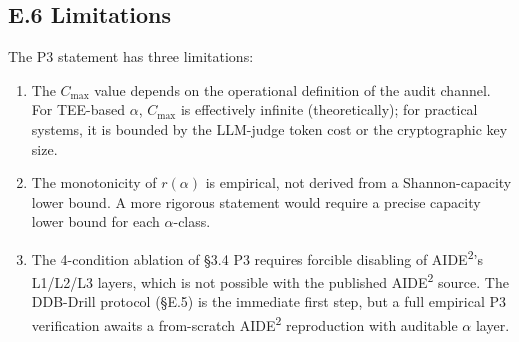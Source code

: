 \subsection*{E.6 Limitations}

The P3 statement has three limitations:
\begin{enumerate}
    \item The $C_{\max}$ value depends on the operational definition of the audit channel. For TEE-based $\alpha$, $C_{\max}$ is effectively infinite (theoretically); for practical systems, it is bounded by the LLM-judge token cost or the cryptographic key size.
    \item The monotonicity of $r(\alpha)$ is empirical, not derived from a Shannon-capacity lower bound. A more rigorous statement would require a precise capacity lower bound for each $\alpha$-class.
    \item The 4-condition ablation of \S3.4 P3 requires forcible disabling of AIDE\textsuperscript{2}'s L1/L2/L3 layers, which is not possible with the published AIDE\textsuperscript{2} source. The DDB-Drill protocol (\S E.5) is the immediate first step, but a full empirical P3 verification awaits a from-scratch AIDE\textsuperscript{2} reproduction with auditable $\alpha$ layer.
\end{enumerate}
